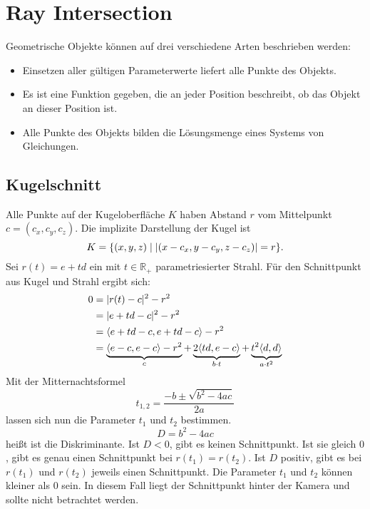 \section{Ray Intersection}
Geometrische Objekte können auf drei verschiedene Arten beschrieben werden:
\begin{itemize}
	\item {}
	Einsetzen aller gültigen Parameterwerte liefert alle Punkte des Objekts.
	\item {}
	Es ist eine Funktion gegeben, die an jeder Position beschreibt, ob das Objekt an dieser Position ist.
	\item {}
	Alle Punkte des Objekts bilden die Lösungsmenge eines Systems von Gleichungen.
\end{itemize}

\subsection{Kugelschnitt}
Alle Punkte auf der Kugeloberfläche $K$ haben Abstand $r$ vom Mittelpunkt $c = (c_x, c_y, c_z)$.
Die implizite Darstellung der Kugel ist
\[
	K = \{(x, y, z) \mid \vert (x - c_x, y - c_y, z - c_z) \vert = r\} \text{.}
\]
Sei $r(t) = e + td$ ein mit $t \in \mathbb{R}_+$ parametriesierter Strahl.
Für den Schnittpunkt aus Kugel und Strahl ergibt sich:
\begin{align*}
	0 &= \vert r(t) - c \vert^2 - r^2 \\
		&= \vert e + td - c \vert^2 - r^2 \\
		&= \langle e + td - c, e + td - c \rangle - r^2 \\
		&= \underbrace{\langle e - c, e - c \rangle - r^2}_c + \underbrace{2 \langle td, e - c \rangle}_{b \cdot t} + \underbrace{t^2 \langle d, d \rangle}_{a \cdot t^2}
\end{align*}
Mit der Mitternachtsformel
\[
	t_{1,2} = \frac{-b \pm \sqrt{b^2 - 4ac}}{2a}
\]
lassen sich nun die Parameter $t_1$ und $t_2$ bestimmen.
\[
	D = b^2 - 4ac
\]
heißt ist die Diskriminante.
Ist $D < 0$, gibt es keinen Schnittpunkt.
Ist sie gleich $0$, gibt es genau einen Schnittpunkt bei $r(t_1) = r(t_2)$.
Ist $D$ positiv, gibt es bei $r(t_1)$ und $r(t_2)$ jeweils einen Schnittpunkt.
Die Parameter $t_1$ und $t_2$ können kleiner als $0$ sein.
In diesem Fall liegt der Schnittpunkt hinter der Kamera und sollte nicht betrachtet werden.


